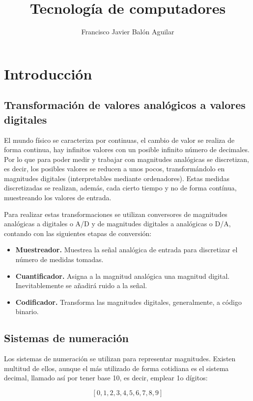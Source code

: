 \documentclass[a4paper, 11pt, titlepage]{article}
\title{Tecnología de computadores}
\author{Francisco Javier Balón Aguilar}
\begin{document}
\maketitle
\renewcommand{\contentsname}{Índice}
\tableofcontents
\newpage

\section{Introducción}

    \subsection{Transformación de valores analógicos a valores digitales}

        El mundo físico se caracteriza por continuas, el cambio de valor se realiza de forma continua, hay infinitos 
        valores con un posible infinito número de decimales. Por lo que para poder medir y trabajar con magnitudes 
        analógicas se discretizan, es decir, los posibles valores se reducen a unos pocos, transformándolo en magnitudes 
        digitales (interpretables mediante ordenadores). Estas medidas discretizadas se realizan, además, cada cierto 
        tiempo y no de forma contínua, muestreando los valores de entrada.

        Para realizar estas transformaciones se utilizan conversores de magnitudes analógicas a digitales o A/D y de 
        magnitudes digitales a analógicas o D/A, contando con las siguientes etapas de conversión:

        \begin{itemize}
            \item \textbf{Muestreador.} Muestrea la señal analógica de entrada para discretizar el número de medidas 
            tomadas.
            \item \textbf{Cuantificador.} Asigna a la magnitud analógica una magnitud digital. Inevitablemente se 
            añadirá ruido a la señal.
            \item \textbf{Codificador.} Transforma las magnitudes digitales, generalmente, a código binario.
        \end{itemize}

    \subsection{Sistemas de numeración}

        Los sistemas de numeración se utilizan para representar magnitudes. Existen multitud de ellos, aunque el más 
        utilizado de forma cotidiana es el sistema decimal, llamado así por tener base 10, es decir, emplear 1o dígitos:

        \[[0,1,2,3,4,5,6,7,8,9]\]
\end{document}

